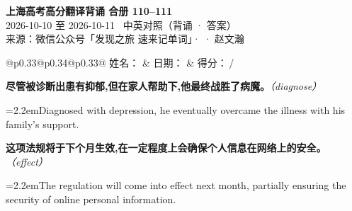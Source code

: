 \documentclass[11pt,a4paper]{article}
\newcommand{\num}[1]{\makebox[1.9em][r]{#1.}\hspace{0.3em}}
\newcommand{\prompt}[1]{\emph{\textcolor{tipblue}{\small（#1）}}}
\begin{document}
\pagestyle{plain}
\begin{center}
{\LARGE\bfseries 上海高考高分翻译背诵 \quad 合册 110–111}\\[0.25em]
{\large 2026-10-10 至 2026-10-11 \quad\ 中英对照（背诵 · 答案）}\\[0.35em]
{\footnotesize 来源：微信公众号「发现之旅 速来记单词」·  · 赵文瀚}
\end{center}

\vspace{0.4em}
\noindent\begin{tabular}{@{}p{0.33\textwidth}@{}p{0.34\textwidth}@{}p{0.33\textwidth}@{}}
姓名：\underline{\hspace{2.0cm}} & 日期：\underline{\hspace{2.0cm}} & 得分：\underline{\hspace{1.4cm}}\,/ \\
\end{tabular}

\vspace{0.5em}

\vspace{0.8em}
\vspace{0.35em}\vspace{0.15em}

\begin{minipage}{\linewidth}

\num{1}\textbf{尽管被诊断出患有抑郁,但在家人帮助下,他最终战胜了病魔。}\prompt{diagnose}

\vspace{0.15em}

\noindent\hangindent=2.2em\hspace{2.2em}Diagnosed with depression, he eventually overcame the illness with his family’s support.

\end{minipage}

\begin{minipage}{\linewidth}

\num{2}\textbf{这项法规将于下个月生效,在一定程度上会确保个人信息在网络上的安全。}\prompt{effect}

\vspace{0.15em}

\noindent\hangindent=2.2em\hspace{2.2em}The regulation will come into effect next month, partially ensuring the security of online personal information.

\end{minipage}
\end{document}
